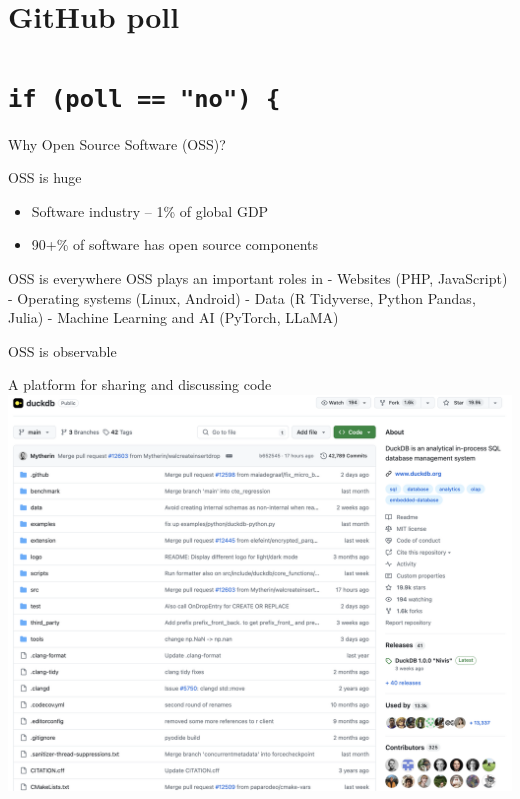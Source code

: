\documentclass[
  ignorenonframetext,
  aspectratio=169,
]{beamer}
\providecommand{\tightlist}{%
  \setlength{\itemsep}{0pt}\setlength{\parskip}{0pt}}
\begin{document}
\section{GitHub poll}\label{github-poll}

\section{\texorpdfstring{\texttt{if\ (poll\ ==\ "no")\ \{}}{if (poll == "no") \{}}\label{if-poll-no}

\begin{frame}{Why Open Source Software (OSS)?}
\protect\hypertarget{why-open-source-software-oss}{}
\begin{block}{OSS is huge}
\protect\hypertarget{oss-is-huge}{}
\begin{itemize}
\tightlist
\item
  Software industry -- 1\% of global GDP
\item
  90+\% of software has open source components
\end{itemize}
\end{block}

\begin{block}{OSS is everywhere}
\protect\hypertarget{oss-is-everywhere}{}
OSS plays an important roles in - Websites (PHP, JavaScript) - Operating
systems (Linux, Android) - Data (R Tidyverse, Python Pandas, Julia) -
Machine Learning and AI (PyTorch, LLaMA)
\end{block}

\begin{block}{OSS is observable}
\protect\hypertarget{oss-is-observable}{}
\end{block}
\end{frame}

\begin{frame}{A platform for sharing and discussing code}
\protect\hypertarget{a-platform-for-sharing-and-discussing-code}{}
\includegraphics{images/duckdb-github.png}
\end{frame}
\end{document}
